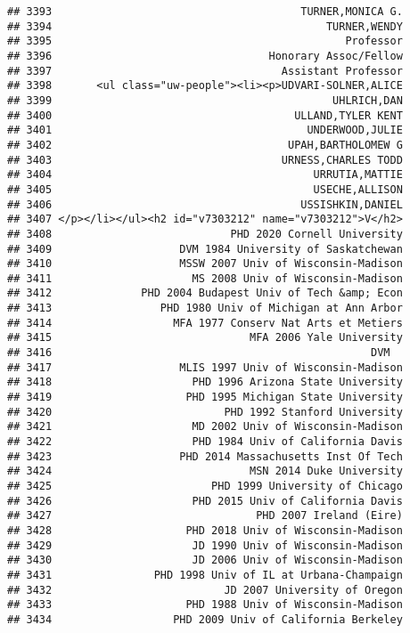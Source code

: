 \documentclass[
]{article}
\begin{document}
\begin{verbatim}
## 3393                                       TURNER,MONICA G.
## 3394                                           TURNER,WENDY
## 3395                                              Professor
## 3396                                  Honorary Assoc/Fellow
## 3397                                    Assistant Professor
## 3398       <ul class="uw-people"><li><p>UDVARI-SOLNER,ALICE
## 3399                                            UHLRICH,DAN
## 3400                                      ULLAND,TYLER KENT
## 3401                                        UNDERWOOD,JULIE
## 3402                                     UPAH,BARTHOLOMEW G
## 3403                                    URNESS,CHARLES TODD
## 3404                                         URRUTIA,MATTIE
## 3405                                         USECHE,ALLISON
## 3406                                       USSISHKIN,DANIEL
## 3407 </p></li></ul><h2 id="v7303212" name="v7303212">V</h2>
## 3408                            PHD 2020 Cornell University
## 3409                    DVM 1984 University of Saskatchewan
## 3410                    MSSW 2007 Univ of Wisconsin-Madison
## 3411                      MS 2008 Univ of Wisconsin-Madison
## 3412              PHD 2004 Budapest Univ of Tech &amp; Econ
## 3413                 PHD 1980 Univ of Michigan at Ann Arbor
## 3414                   MFA 1977 Conserv Nat Arts et Metiers
## 3415                               MFA 2006 Yale University
## 3416                                                  DVM  
## 3417                    MLIS 1997 Univ of Wisconsin-Madison
## 3418                      PHD 1996 Arizona State University
## 3419                     PHD 1995 Michigan State University
## 3420                           PHD 1992 Stanford University
## 3421                      MD 2002 Univ of Wisconsin-Madison
## 3422                      PHD 1984 Univ of California Davis
## 3423                    PHD 2014 Massachusetts Inst Of Tech
## 3424                               MSN 2014 Duke University
## 3425                         PHD 1999 University of Chicago
## 3426                      PHD 2015 Univ of California Davis
## 3427                                PHD 2007 Ireland (Eire)
## 3428                     PHD 2018 Univ of Wisconsin-Madison
## 3429                      JD 1990 Univ of Wisconsin-Madison
## 3430                      JD 2006 Univ of Wisconsin-Madison
## 3431                PHD 1998 Univ of IL at Urbana-Champaign
## 3432                           JD 2007 University of Oregon
## 3433                     PHD 1988 Univ of Wisconsin-Madison
## 3434                   PHD 2009 Univ of California Berkeley

\end{verbatim}
\end{document}
